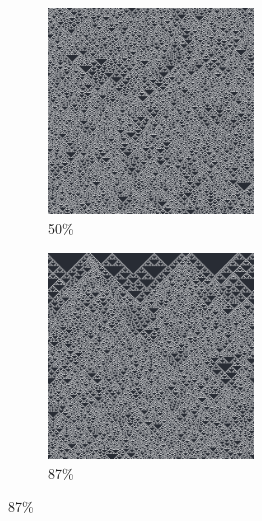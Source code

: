 \documentclass[12pt, fleqn]{report}                             %
\theoremstyle{break}                                            %
\begin{document}
\begin{figure}[ht!]
\begin{subfigure}[b]{0.4\linewidth}
          \includegraphics[width=0.6\textwidth]{Images/22/c.png}
          \caption{50\%}
        \end{subfigure}
        \begin{subfigure}[b]{0.4\linewidth}
          \includegraphics[width=0.6\textwidth]{Images/22/d.png}
          \caption{87\%}
        \end{subfigure}
      \end{figure}
\end{document}
